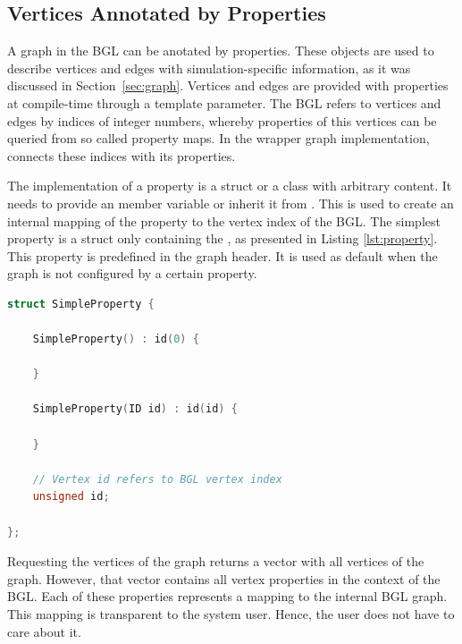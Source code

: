 \subsection{Vertices Annotated by Properties}

A graph in the BGL can be anotated by properties. These objects are
used to describe vertices and edges with simulation-specific
information, as it was discussed in Section~\ref{sec:graph}. Vertices
and edges are provided with properties at compile-time through a
template parameter.  The BGL refers to vertices and edges by indices
of integer numbers, whereby properties of this vertices can be queried
from so called property maps.  In the wrapper graph implementation,
connects these indices with its properties.

The implementation of a property is a struct or a class with arbitrary
content. It needs to provide an  member variable or inherit
it from . This  is used to create an internal
mapping of the property to the vertex index of the BGL.  The 
simplest property is a struct only containing the , as
presented in Listing \ref{lst:property}. This property is predefined
in the graph header. It is used as default when the graph is not
configured by a certain property.

\begin{lstlisting}[language=C++, label=lst:property, caption={\ }]
struct SimpleProperty {

    SimpleProperty() : id(0) {

    }
    
    SimpleProperty(ID id) : id(id) {

    }

    // Vertex id refers to BGL vertex index
    unsigned id;
    
};
\end{lstlisting}

\noindent Requesting the vertices of the graph returns a vector with
all vertices of the graph. However, that vector contains all vertex
properties in the context of the BGL. Each of these properties
represents a mapping to the internal BGL graph. This mapping is
transparent to the system user. Hence, the user does not have to care
about it.

